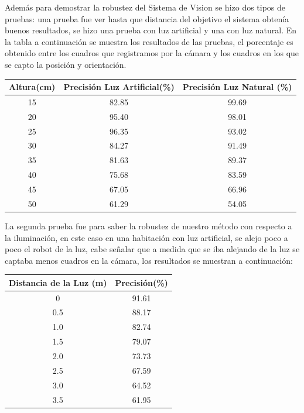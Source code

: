 Adem\'as para demostrar la robustez del Sistema de Vision se hizo dos tipos de pruebas: una prueba fue ver hasta que distancia del objetivo el sistema obten\'ia buenos resultados, se hizo una prueba con luz artificial y una con luz natural. En la  tabla a continuaci\'on se muestra los resultados de las pruebas, el porcentaje es obtenido entre los cuadros que registramos por la c\'amara y los cuadros en los que se capto la posici\'on y orientaci\'on.\\
\begin{center}


\begin{tabular}{|c|c|c|}
\hline 
\textbf{Altura(cm)} & \textbf{Precisi\'on Luz Artificial(\%)} & \textbf{Precisi\'on Luz Natural (\%)} \\ 
\hline 
15 & 82.85 & 99.69 \\ 
\hline 
20 & 95.40 & 98.01 \\ 
\hline 
25 & 96.35 & 93.02 \\ 
\hline 
30 & 84.27 & 91.49 \\ 
\hline 
35 & 81.63 & 89.37 \\ 
\hline 
40 & 75.68 & 83.59 \\ 
\hline 
45 & 67.05 & 66.96 \\ 
\hline 
50 & 61.29 & 54.05 \\ 
\hline 
\end{tabular} 
\end{center}
La segunda prueba fue para saber la robustez de nuestro m\'etodo con respecto a la iluminaci\'on, en este caso en una habitaci\'on con luz artificial, se alejo poco a poco el robot de la luz, cabe se\~nalar que a medida que se iba alejando de la luz se captaba menos cuadros en la c\'amara, los resultados se muestran a continuaci\'on:\\
\begin{center}
\begin{tabular}{|c|c|}
\hline 
\textbf{Distancia de la Luz (m)} & \textbf{Precisi\'on(\%)} \\ 
\hline 
0 & 91.61 \\ 
\hline 
0.5 & 88.17 \\ 
\hline 
1.0 & 82.74 \\ 
\hline 
1.5 & 79.07 \\ 
\hline 
2.0 & 73.73 \\ 
\hline 
2.5 & 67.59 \\ 
\hline 
3.0 & 64.52 \\ 
\hline 
3.5 & 61.95 \\ 

\hline 
\end{tabular} 
\end{center}

